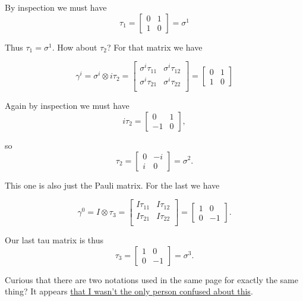 By inspection we must have
\begin{equation}\label{eqn:zeeTauMatrix:30}
\tau_1 = 
\begin{bmatrix}
0 & 1 \\
1 & 0
\end{bmatrix}
= \sigma^1
\end{equation}

Thus $\tau_1 = \sigma^1$.  How about $\tau_2$?  For that matrix we have

\begin{equation}\label{eqn:zeeTauMatrix:50}
\gamma^i = \sigma^i \otimes i \tau_2 =
\begin{bmatrix}
\sigma^i \tau_{11} & \sigma^i \tau_{12} \\
\sigma^i \tau_{21} & \sigma^i \tau_{22} \\
\end{bmatrix}
= 
\begin{bmatrix}
0 & 1 \\
1 & 0
\end{bmatrix}
\end{equation}

Again by inspection we must have
\begin{equation}\label{eqn:zeeTauMatrix:70}
i \tau_2 = 
\begin{bmatrix}
0 & 1 \\
-1 & 0
\end{bmatrix},
\end{equation}

so
\begin{equation}\label{eqn:zeeTauMatrix:90}
\tau_2 = 
\begin{bmatrix}
0 & -i \\
i & 0
\end{bmatrix}
= \sigma^2.
\end{equation}

This one is also just the Pauli matrix.  For the last we have

\begin{equation}\label{eqn:zeeTauMatrix:110}
\gamma^0 = I \otimes \tau_3 =
\begin{bmatrix}
I \tau_{11} & I \tau_{12} \\
I \tau_{21} & I \tau_{22} \\
\end{bmatrix}
= 
\begin{bmatrix}
1 & 0 \\
0 & -1
\end{bmatrix}.
\end{equation}

Our last tau matrix is thus
\begin{equation}\label{eqn:zeeTauMatrix:130}
\tau_3 = 
\begin{bmatrix}
1 & 0 \\
0 & -1
\end{bmatrix}
= \sigma^3.
\end{equation}

Curious that there are two notations used in the same page for exactly the same thing?  It appears \href{http://www.physicsforums.com/showthread.php?p=2844657}{that I wasn't the only person confused about this}.

\EndArticle
